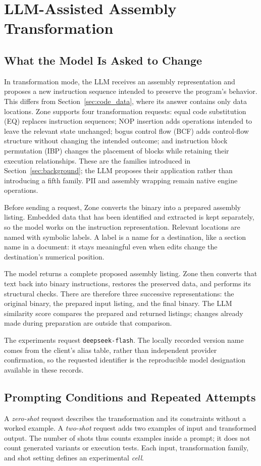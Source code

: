 \section{LLM-Assisted Assembly Transformation}\label{sec:llm}
\subsection{What the Model Is Asked to Change}
In transformation mode, the LLM receives an assembly representation and
proposes a new instruction sequence intended to preserve the program's
behavior. This differs from Section~\ref{sec:code_data}, where its answer
contains only data locations. Zone supports four transformation requests:
equal code substitution (EQ) replaces instruction sequences; NOP insertion
adds operations intended to leave the relevant state unchanged; bogus
control flow (BCF) adds control-flow structure without changing the intended
outcome; and instruction block permutation (IBP) changes the placement of
blocks while retaining their execution relationships. These are the
families introduced in Section~\ref{sec:background}; the LLM proposes their
application rather than introducing a fifth family. PII and assembly
wrapping remain native engine operations.

Before sending a request, Zone converts the binary into a prepared
assembly listing. Embedded data that has been identified and extracted is
kept separately, so the model works on the instruction representation.
Relevant locations are named with symbolic labels. A label is a name for
a destination, like a section name in a document: it stays meaningful even
when edits change the destination's numerical position.

The model returns a complete proposed assembly listing. Zone then converts
that text back into binary instructions, restores the preserved data, and
performs its structural checks. There are therefore three successive
representations: the original binary, the prepared input listing, and the
final binary. The LLM similarity score compares the prepared and returned
listings; changes already made during preparation are outside that comparison.

The experiments request \texttt{deepseek-flash}. The locally recorded
version name comes from the client's alias table, rather than independent
provider confirmation, so the requested identifier is the reproducible
model designation available in these records.

\subsection{Prompting Conditions and Repeated Attempts}
A \emph{zero-shot} request describes the transformation and its constraints
without a worked example. A \emph{two-shot} request adds two examples of
input and transformed output. The number of shots thus counts examples
inside a prompt; it does not count generated variants or execution tests.
Each input, transformation family, and shot setting defines an experimental
\emph{cell}.

